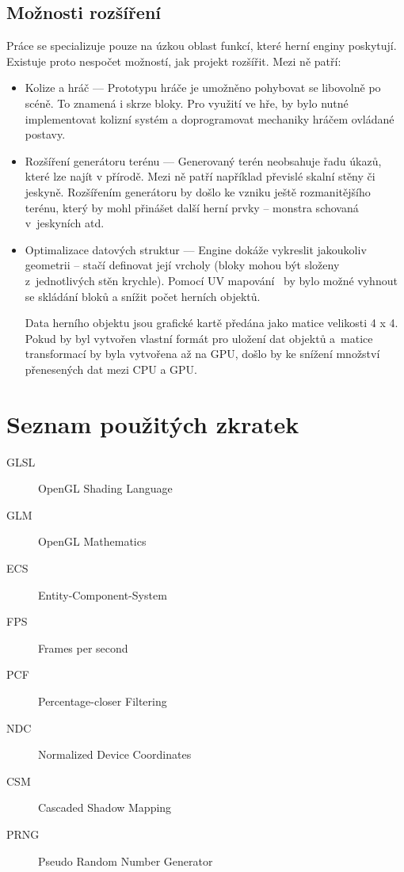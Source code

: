 \documentclass[thesis=M,czech]{FITthesis}[2019/12/23]
\begin{document}
\begin{conclusion}
\section{Možnosti rozšíření}
Práce se specializuje pouze na úzkou oblast funkcí, které herní enginy poskytují. Existuje proto nespočet možností, jak projekt rozšířit. Mezi ně patří:

\begin{itemize}
\item Kolize a hráč --- Prototypu hráče je umožněno pohybovat se libovolně po scéně. To znamená i skrze bloky. Pro využití ve hře, by bylo nutné implementovat kolizní systém a doprogramovat mechaniky hráčem ovládané postavy.

\item Rozšíření generátoru terénu --- Generovaný terén neobsahuje řadu úkazů, které lze najít v přírodě. Mezi ně patří například převislé skalní stěny či jeskyně. Rozšířením generátoru by došlo ke vzniku ještě rozmanitějšího terénu, který by mohl přinášet další herní prvky -- monstra schovaná v~jeskyních atd.

\item Optimalizace datových struktur --- Engine dokáže vykreslit jakoukoliv geometrii -- stačí definovat její vrcholy (bloky mohou být složeny z~jednotlivých stěn krychle). Pomocí UV mapování~\cite{uv_mapping} by bylo možné vyhnout se skládání bloků a snížit počet herních objektů. 

Data herního objektu jsou grafické kartě předána jako matice velikosti 4 x 4. Pokud by byl vytvořen vlastní formát pro uložení dat objektů a~matice transformací by byla vytvořena až na GPU, došlo by ke snížení množství přenesených dat mezi CPU a GPU. 
\end{itemize}

\end{conclusion}




\appendix

\chapter{Seznam použitých zkratek}
\begin{description}
	\item[GLSL] OpenGL Shading Language
	\item[GLM] OpenGL Mathematics
	\item[ECS] Entity-Component-System
	\item[FPS] Frames per second
	\item[PCF] Percentage-closer Filtering
	\item[NDC] Normalized Device Coordinates
	\item[CSM] Cascaded Shadow Mapping
	\item[PRNG] Pseudo Random Number Generator
\end{description}
\end{document}
